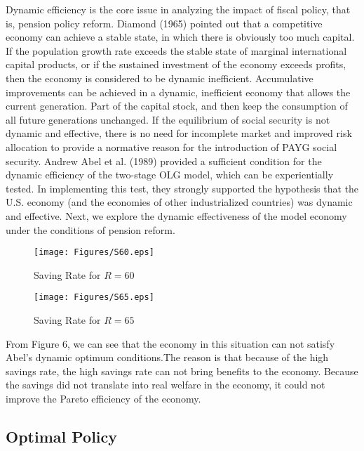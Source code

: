 \documentclass{article}
\begin{document}
        Dynamic efficiency is the core issue in analyzing the impact of fiscal policy, that is, pension policy reform. Diamond (1965) pointed out that a competitive economy 
        can achieve a stable state, in which there is obviously too much capital. If the population growth rate exceeds the stable state of marginal international capital products, or if the sustained investment of the economy exceeds profits, then the economy is considered to be dynamic inefficient.  Accumulative improvements can be achieved in a dynamic, inefficient economy that allows the current generation. Part of the capital stock, and then keep the consumption of all future generations unchanged. If the equilibrium of social security is not dynamic and effective, there is no need for incomplete market and improved risk allocation to provide a normative reason for the introduction of PAYG social security. Andrew Abel et al. (1989) provided a sufficient condition for the dynamic efficiency of the two-stage OLG model, which can be experientially tested. In implementing this test, they strongly supported the hypothesis that the U.S. economy (and the economies of other industrialized countries) was dynamic and effective.
        Next, we explore the dynamic effectiveness of the model economy under the conditions of pension reform.

        \begin{figure}[H]
            \centering
            \texttt{[image: Figures/S60.eps]}
            \caption{Saving Rate for $R=60$}
        \end{figure}

        \begin{figure}[H]
            \centering
            \texttt{[image: Figures/S65.eps]}
            \caption{Saving Rate for $R=65$}
        \end{figure}

        From Figure 6, we can see that the economy in this situation can not satisfy Abel's dynamic optimum conditions.The reason is that because of the high savings rate, the high savings rate can not bring benefits to the economy. Because the savings did not translate into real welfare in the economy, it could not improve the Pareto efficiency of the economy.

    \subsection{Optimal Policy}
        
\end{document}
